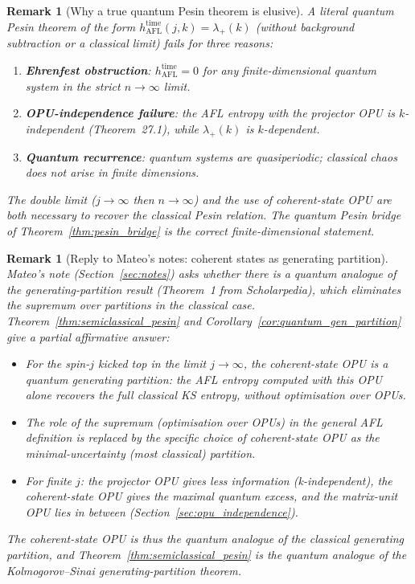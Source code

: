 \documentclass[12pt,a4paper]{article}
\newtheorem{remark}[theorem]{Remark}
\begin{document}
\begin{remark}[Why a true quantum Pesin theorem is elusive]
  A literal quantum Pesin theorem of the form
  $h_{\mathrm{AFL}}^{\mathrm{time}}(j,k) = \lambda_+(k)$ (without background
  subtraction or a classical limit) fails for three reasons:
  \begin{enumerate}
    \item \textbf{Ehrenfest obstruction}: $h_{\mathrm{AFL}}^{\mathrm{time}} = 0$ for
      any finite-dimensional quantum system in the strict $n\to\infty$ limit.
    \item \textbf{OPU-independence failure}: the AFL entropy with the projector OPU
      is $k$-independent (Theorem~27.1), while $\lambda_+(k)$ is $k$-dependent.
    \item \textbf{Quantum recurrence}: quantum systems are quasiperiodic;
      classical chaos does not arise in finite dimensions.
  \end{enumerate}
  The double limit ($j\to\infty$ then $n\to\infty$) and the use of coherent-state
  OPU are both \emph{necessary} to recover the classical Pesin relation.
  The quantum Pesin bridge of Theorem~\ref{thm:pesin_bridge} is the correct
  finite-dimensional statement.
\end{remark}

\begin{remark}[Reply to Mateo's notes: coherent states as generating partition]
  Mateo's note (Section~\ref{sec:notes}) asks whether there is a quantum
  analogue of the generating-partition result (Theorem~1 from Scholarpedia),
  which eliminates the supremum over partitions in the classical case.
  Theorem~\ref{thm:semiclassical_pesin} and Corollary~\ref{cor:quantum_gen_partition}
  give a partial affirmative answer:
  \begin{itemize}
    \item For the spin-$j$ kicked top in the limit $j\to\infty$, the coherent-state OPU
      is a \emph{quantum generating partition}: the AFL entropy computed with this OPU
      alone recovers the full classical KS entropy, without optimisation over OPUs.
    \item The role of the supremum (optimisation over OPUs) in the general AFL definition
      is replaced by the \emph{specific choice} of coherent-state OPU as the minimal-uncertainty
      (most classical) partition.
    \item For finite $j$: the projector OPU gives less information (k-independent),
      the coherent-state OPU gives the maximal quantum excess, and the matrix-unit OPU
      lies in between (Section~\ref{sec:opu_independence}).
  \end{itemize}
  The coherent-state OPU is thus the quantum analogue of the classical generating partition,
  and Theorem~\ref{thm:semiclassical_pesin} is the quantum analogue of the
  Kolmogorov--Sinai generating-partition theorem.
\end{remark}
\end{document}
